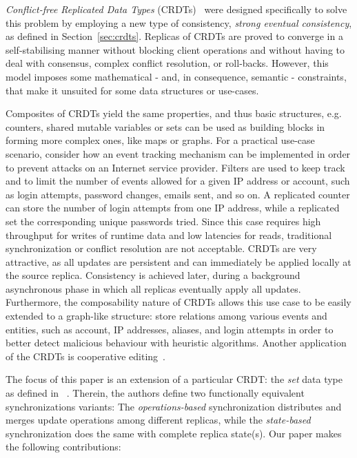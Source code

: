 \textit{Conflict-free Replicated Data Types}
(CRDTs)~\cite{Shapiro:2011:CRD:2050613.2050642} were designed specifically to
solve this problem by employing a new type of consistency, \textit{strong
eventual consistency}, as defined in Section~\ref{sec:crdts}. Replicas of CRDTs
are proved to converge in a self-stabilising manner without blocking client
operations and without having to deal with consensus, complex conflict
resolution, or roll-backs. However, this model imposes some mathematical - and,
in consequence, semantic - constraints, that make it unsuited for some data
structures or use-cases.

Composites of CRDTs yield the same properties, and thus basic structures, e.g.
counters, shared mutable variables or sets can be used as building blocks in
forming more complex ones, like maps or graphs. For a practical use-case
scenario, consider how an event tracking mechanism can be implemented in order
to prevent attacks on an Internet service provider. Filters are used to keep
track and to limit the number of events allowed for a given IP address or
account, such as login attempts, password changes, emails sent, and so on. A
replicated counter can store the number of login attempts from one IP address,
while a replicated set the corresponding unique passwords tried. Since this case
requires high throughput for writes of runtime data and low latencies for reads,
traditional synchronization or conflict resolution are not acceptable. CRDTs are
very attractive, as all updates are persistent and can immediately be applied
locally at the source replica. Consistency is achieved later, during a
background asynchronous phase in which all replicas eventually apply all
updates. Furthermore, the composability nature of CRDTs allows this use case to
be easily extended to a graph-like structure: store relations among various
events and entities, such as account, IP addresses, aliases, and login attempts
in order to better detect malicious behaviour with heuristic algorithms. Another
application of the CRDTs is cooperative
editing~\cite{Preguica:2009:CRD:1584339.1584604}.

The focus of this paper is an extension of a particular CRDT: the \textit{set}
data type as defined in ~\cite{Shapiro:2011:CRD:2050613.2050642}. Therein, the
authors define two functionally equivalent synchronizations variants: The
\textit{operations-based} synchronization distributes and merges update
operations among different replicas, while the \textit{state-based}
synchronization does the same with complete replica state(s). Our paper makes
the following contributions:

